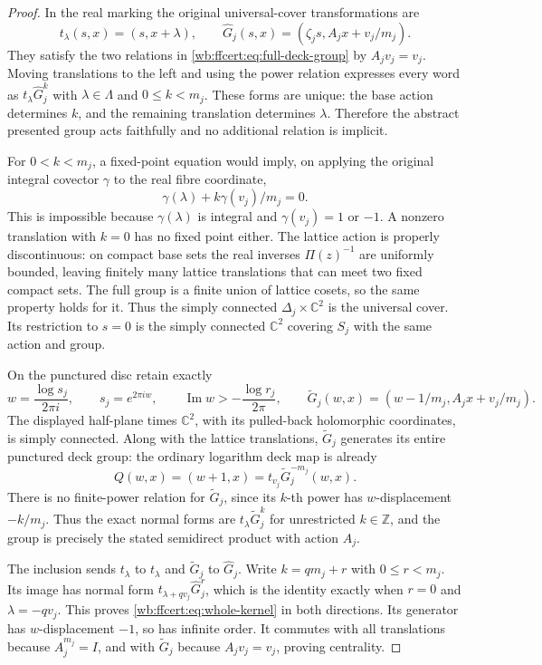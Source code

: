 \begin{proof}
In the real marking the original universal-cover transformations are
\[
 t_\lambda(s,x)=(s,x+\lambda),\qquad
 \widehat G_j(s,x)=(\zeta_js,A_jx+v_j/m_j).
 \tag{FF32}\label{wb:ffcert:eq:cover-real-action}
\]
They satisfy the two relations in
\eqref{wb:ffcert:eq:full-deck-group} by $A_jv_j=v_j$.
Moving translations to the left and using the power relation expresses
every word as $t_\lambda\widehat G_j^k$ with $\lambda\in\Lambda$
and $0\le k<m_j$. These forms are unique: the base action determines
$k$, and the remaining translation determines $\lambda$. Therefore
the abstract presented group acts faithfully and no additional relation
is implicit.

For $0<k<m_j$, a fixed-point equation would imply, on applying the
original integral covector $\gamma$ to the real fibre coordinate,
\[
 \gamma(\lambda)+k\gamma(v_j)/m_j=0.
 \tag{FF33}\label{wb:ffcert:eq:cover-freeness}
\]
This is impossible because $\gamma(\lambda)$ is integral and
$\gamma(v_j)=1$ or $-1$. A nonzero translation with $k=0$ has no
fixed point either. The lattice action is properly discontinuous:
on compact base sets the real inverses $\Pi(z)^{-1}$ are uniformly
bounded, leaving finitely many lattice translations that can meet two
fixed compact sets. The full group is a finite union of lattice cosets,
so the same property holds for it. Thus the simply connected
$\Delta_j\times\mathbb C^2$ is the universal cover. Its restriction
to $s=0$ is the simply connected $\mathbb C^2$ covering $S_j$ with
the same action and group.

On the punctured disc retain exactly
\[
 w=\frac{\log s_j}{2\pi i},\qquad s_j=e^{2\pi iw},\qquad
 \operatorname{Im}w> -\frac{\log r_j}{2\pi},
 \qquad
 \widetilde G_j(w,x)=(w-1/m_j,A_jx+v_j/m_j).
 \tag{FF34}\label{wb:ffcert:eq:log-cover-action}
\]
The displayed half-plane times $\mathbb C^2$, with its pulled-back
holomorphic coordinates, is simply connected. Along with the lattice
translations, $\widetilde G_j$ generates its entire punctured deck
group: the ordinary logarithm deck map is already
\[
 Q(w,x)=(w+1,x)=t_{v_j}\widetilde G_j^{-m_j}(w,x).
 \tag{FF35}\label{wb:ffcert:eq:ordinary-log-deck}
\]
There is no finite-power relation for $\widetilde G_j$, since its
$k$-th power has $w$-displacement $-k/m_j$. Thus the exact normal
forms are $t_\lambda\widetilde G_j^k$ for unrestricted
$k\in\mathbb Z$, and the group is precisely the stated semidirect
product with action $A_j$.

The inclusion sends $t_\lambda$ to $t_\lambda$ and
$\widetilde G_j$ to $\widehat G_j$. Write $k=qm_j+r$ with
$0\le r<m_j$. Its image has normal form
$t_{\lambda+qv_j}\widehat G_j^r$, which is the identity exactly
when $r=0$ and $\lambda=-qv_j$. This proves
\eqref{wb:ffcert:eq:whole-kernel} in both directions. Its generator has
$w$-displacement $-1$, so has infinite order. It commutes with all
translations because $A_j^{m_j}=I$, and with
$\widetilde G_j$ because $A_jv_j=v_j$, proving centrality.
\end{proof}

